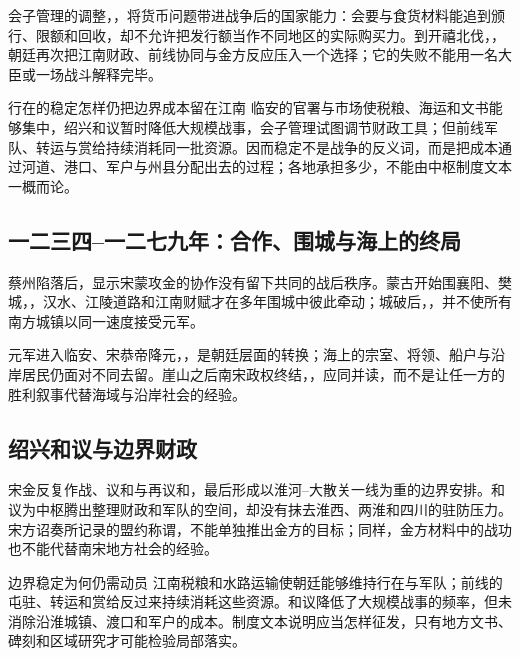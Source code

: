 会子管理的调整，，将货币问题带进战争后的国家能力：会要与食货材料能追到颁行、限额和回收，却不允许把发行额当作不同地区的实际购买力。到开禧北伐，，朝廷再次把江南财政、前线协同与金方反应压入一个选择；它的失败不能用一名大臣或一场战斗解释完毕。

\begin{causalchain}{行在的稳定怎样仍把边界成本留在江南}
临安的官署与市场使税粮、海运和文书能够集中，绍兴和议暂时降低大规模战事，会子管理试图调节财政工具；但前线军队、转运与赏给持续消耗同一批资源。因而稳定不是战争的反义词，而是把成本通过河道、港口、军户与州县分配出去的过程；各地承担多少，不能由中枢制度文本一概而论。
\end{causalchain}

\subsection{一二三四--一二七九年：合作、围城与海上的终局}
蔡州陷落后，显示宋蒙攻金的协作没有留下共同的战后秩序。蒙古开始围襄阳、樊城，，汉水、江陵道路和江南财赋才在多年围城中彼此牵动；城破后，，并不使所有南方城镇以同一速度接受元军。

元军进入临安、宋恭帝降元，，是朝廷层面的转换；海上的宗室、将领、船户与沿岸居民仍面对不同去留。崖山之后南宋政权终结，，应同并读，而不是让任一方的胜利叙事代替海域与沿岸社会的经验。

\subsection{绍兴和议与边界财政}
宋金反复作战、议和与再议和，最后形成以淮河--大散关一线为重的边界安排。和议为中枢腾出整理财政和军队的空间，却没有抹去淮西、两淮和四川的驻防压力。宋方诏奏所记录的盟约称谓，不能单独推出金方的目标；同样，金方材料中的战功也不能代替南宋地方社会的经验。

\begin{causalchain}{边界稳定为何仍需动员}
江南税粮和水路运输使朝廷能够维持行在与军队；前线的屯驻、转运和赏给反过来持续消耗这些资源。和议降低了大规模战事的频率，但未消除沿淮城镇、渡口和军户的成本。制度文本说明应当怎样征发，只有地方文书、碑刻和区域研究才可能检验局部落实。
\end{causalchain}

